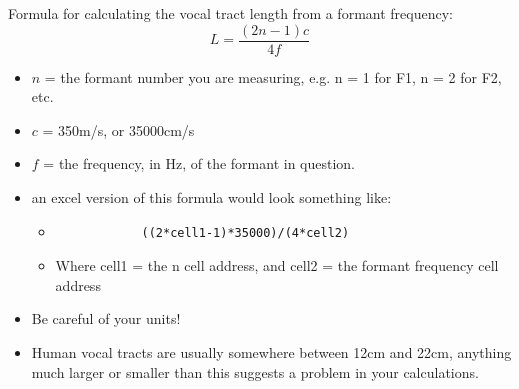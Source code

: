 \documentclass[12pt, letterpaper]{article}
\begin{document}
Formula for calculating the vocal tract length from a formant frequency:
\begin{equation*}
    L = \frac{(2n-1)c}{4f}
\end{equation*}
\begin{itemize}
    \item $n$ = the formant number you are measuring, e.g. n = 1 for F1, n = 2 for F2, etc.
    \item $c$ = 350m/s, or 35000cm/s
    \item $f$ = the frequency, in Hz, of the formant in question.
    \item an excel version of this formula would look something like:
    \begin{itemize}
        \item 
        \begin{verbatim}
            ((2*cell1-1)*35000)/(4*cell2)
        \end{verbatim}
        \item Where cell1 = the n cell address, and cell2 = the formant frequency cell address
    \end{itemize}
    \item Be careful of your units!
    \item Human vocal tracts are usually somewhere between 12cm and 22cm, anything much larger or smaller than this suggests a problem in your calculations.
\end{itemize}


\end{document}
